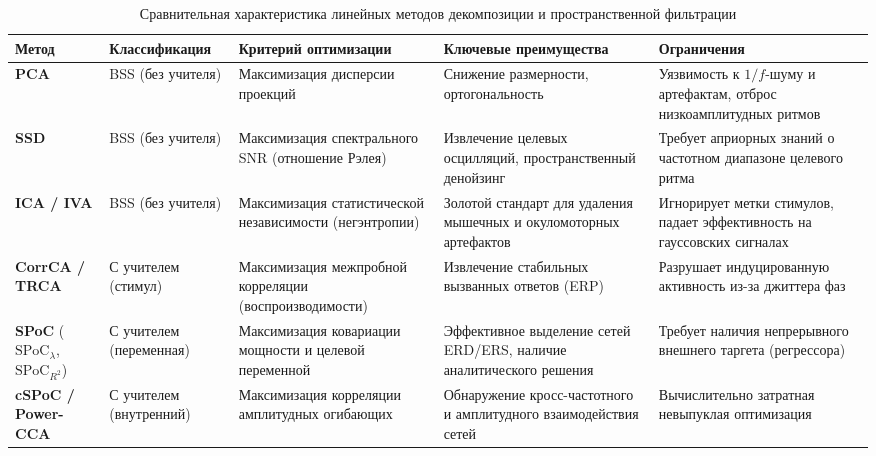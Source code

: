 \begin{table}
	\centering
	\caption{Сравнительная характеристика линейных методов декомпозиции и пространственной фильтрации}
	\label{tab:linear_methods}
	\renewcommand{\arraystretch}{1.4} %
	\small
	\begin{tabularx}{\textwidth}{|>{\raggedright\arraybackslash}p{2.5cm}|>{\raggedright\arraybackslash}p{2.5cm}|>{\raggedright\arraybackslash}X|>{\raggedright\arraybackslash}X|>{\raggedright\arraybackslash}X|}
		\hline
		\textbf{Метод} & \textbf{Классификация} & \textbf{Критерий оптимизации} & \textbf{Ключевые преимущества} & \textbf{Ограничения} \\
		\hline
		\textbf{PCA} & BSS (без учителя) & Максимизация дисперсии проекций & Снижение размерности, ортогональность & Уязвимость к $1/f$-шуму и артефактам, отброс низкоамплитудных ритмов \\
		\hline
		\textbf{SSD} & BSS (без учителя) & Максимизация спектрального SNR (отношение Рэлея) & Извлечение целевых осцилляций, пространственный денойзинг & Требует априорных знаний о частотном диапазоне целевого ритма \\
		\hline
		\textbf{ICA / IVA} & BSS (без учителя) & Максимизация статистической независимости (негэнтропии) & Золотой стандарт для удаления мышечных и окуломоторных артефактов & Игнорирует метки стимулов, падает эффективность на гауссовских сигналах \\
		\hline
		\textbf{CorrCA / TRCA} & С учителем (стимул) & Максимизация межпробной корреляции (воспроизводимости) & Извлечение стабильных вызванных ответов (ERP) & Разрушает индуцированную активность из-за джиттера фаз \\
		\hline
		\textbf{SPoC} ($\text{SPoC}_\lambda$, $\text{SPoC}_{R^2}$) & С учителем (переменная) & Максимизация ковариации мощности и целевой переменной & Эффективное выделение сетей ERD/ERS, наличие аналитического решения & Требует наличия непрерывного внешнего таргета (регрессора) \\
		\hline
		\textbf{cSPoC / Power-CCA} & С учителем (внутренний) & Максимизация корреляции амплитудных огибающих & Обнаружение кросс-частотного и амплитудного взаимодействия сетей & Вычислительно затратная невыпуклая оптимизация \\
		\hline
	\end{tabularx}
\end{table}


